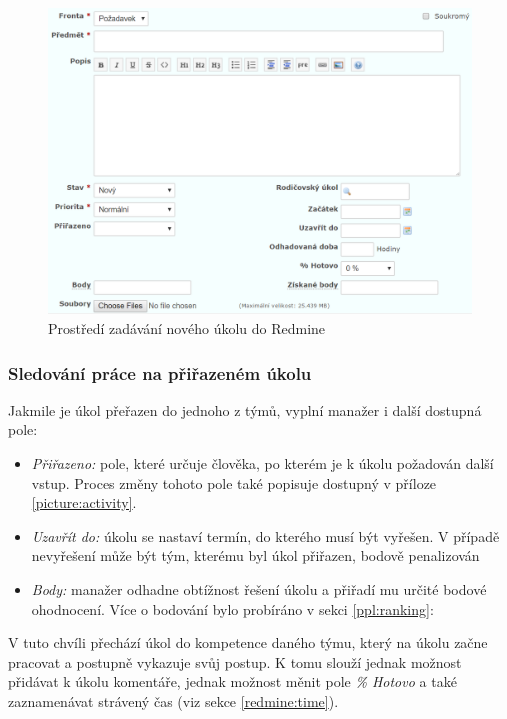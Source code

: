 \begin{figure}[H]
\includegraphics[width=\textwidth]{../png/redmine.png}
\caption{Prostředí zadávání nového úkolu do Redmine} \label{picture:redmine}
\end{figure}

\subsubsection{Sledování práce na přiřazeném úkolu}

Jakmile je úkol přeřazen do jednoho z týmů, vyplní manažer i další dostupná pole:
\begin{itemize}
	\item \emph{Přiřazeno:} pole, které určuje člověka, po kterém je k úkolu požadován další vstup. Proces změny tohoto pole také popisuje  dostupný v příloze \ref{picture:activity}.
	\item \emph{Uzavřít do:} úkolu se nastaví termín, do kterého musí být vyřešen. V případě nevyřešení může být tým, kterému byl úkol přiřazen, bodově penalizován
	\item \emph{Body:} manažer odhadne obtížnost řešení úkolu a přiřadí mu určité bodové ohodnocení. Více o bodování bylo probíráno v sekci \ref{ppl:ranking}: 
\end{itemize}

V tuto chvíli přechází úkol do kompetence daného týmu, který na úkolu začne pracovat a postupně vykazuje svůj postup. K tomu slouží jednak možnost přidávat k úkolu komentáře, jednak možnost měnit pole \emph{\% Hotovo} a také zaznamenávat strávený čas (viz sekce \ref{redmine:time}).

